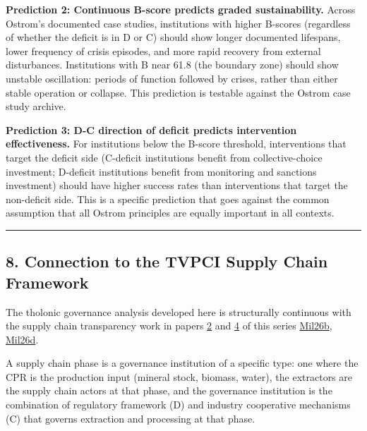 \documentclass[
  11pt,
  letterpaper,
]{article}
\begin{document}
\textbf{Prediction 2: Continuous B-score predicts graded
sustainability.} Across Ostrom's documented case studies, institutions
with higher B-scores (regardless of whether the deficit is in D or C)
should show longer documented lifespans, lower frequency of crisis
episodes, and more rapid recovery from external disturbances.
Institutions with B near 61.8 (the boundary zone) should show unstable
oscillation: periods of function followed by crises, rather than either
stable operation or collapse. This prediction is testable against the
Ostrom case study archive.

\textbf{Prediction 3: D-C direction of deficit predicts intervention
effectiveness.} For institutions below the B-score threshold,
interventions that target the deficit side (C-deficit institutions
benefit from collective-choice investment; D-deficit institutions
benefit from monitoring and sanctions investment) should have higher
success rates than interventions that target the non-deficit side. This
is a specific prediction that goes against the common assumption that
all Ostrom principles are equally important in all contexts.

\begin{center}\rule{0.5\linewidth}{0.5pt}\end{center}

\subsection{8. Connection to the TVPCI Supply Chain
Framework}\label{connection-to-the-tvpci-supply-chain-framework}

The tholonic governance analysis developed here is structurally
continuous with the supply chain transparency work in papers
\href{https://github.com/baardev/truevalue/blob/main/docnav/Research/papers/2_supply-chain-transparency-tvpci/2_supply-chain-transparency-tvpci.pdf}{2}
and
\href{https://github.com/baardev/truevalue/blob/main/docnav/Research/papers/4_game-theoretic-triadic-balance/4_game-theoretic-triadic-balance.pdf}{4}
of this series
\href{https://github.com/baardev/truevalue/blob/main/docnav/Research/papers/2_supply-chain-transparency-tvpci/2_supply-chain-transparency-tvpci.pdf}{Mil26b},
\href{https://github.com/baardev/truevalue/blob/main/docnav/Research/papers/4_game-theoretic-triadic-balance/4_game-theoretic-triadic-balance.pdf}{Mil26d}.

A supply chain phase is a governance institution of a specific type: one
where the CPR is the production input (mineral stock, biomass, water),
the extractors are the supply chain actors at that phase, and the
governance institution is the combination of regulatory framework (D)
and industry cooperative mechanisms (C) that governs extraction and
processing at that phase.
\end{document}
